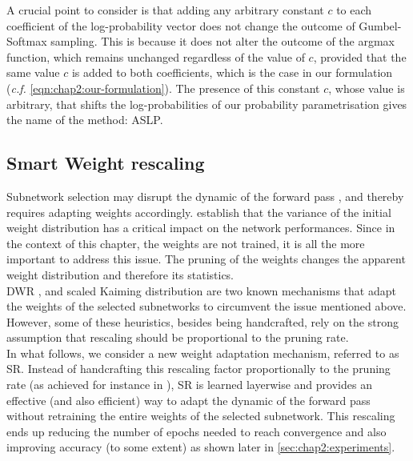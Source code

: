 A crucial point to consider is that adding any arbitrary constant $c$ to each
coefficient of the log-probability vector does not change the outcome of
Gumbel-Softmax sampling. This is because it does not alter the outcome of the
argmax function, which remains unchanged regardless of the value of $c$,
provided that the same value $c$ is added to both coefficients, which is the case
in our formulation (\emph{c.f.} \cref{eqn:chap2:our-formulation}). The
presence of this constant $c$, whose value is arbitrary, that shifts the
log-probabilities of our probability parametrisation gives the name of the
method: \acl{ASLP}.\\ 



\subsection{Smart Weight rescaling}
\label{sec:smart-rescale}
Subnetwork selection may disrupt the dynamic of the forward pass
\cite{DBLP:conf/iccv/HeZRS15,DBLP:conf/cvpr/RamanujanWKFR20}, and thereby
requires adapting weights accordingly. \cite{DBLP:conf/iccv/HeZRS15} establish
that the variance of the initial weight distribution has a critical impact on
the network performances. Since in the context of this chapter, the weights are
not trained, it is all the more important to address this issue. The pruning of
the weights changes the apparent weight distribution and therefore its
statistics.\\

\ac{DWR} \cite{DBLP:conf/nips/ZhouLLY19}, and scaled Kaiming distribution
\cite{DBLP:conf/cvpr/RamanujanWKFR20} are two known mechanisms that adapt the
weights of the selected subnetworks to circumvent the issue mentioned above.
However, some of these heuristics, besides being handcrafted, rely on the
strong assumption that rescaling should be proportional to the pruning rate.\\

In what follows, we consider a new weight adaptation mechanism, referred to as
\ac{SR}. Instead of handcrafting this rescaling factor proportionally
to the pruning rate (as achieved for instance in
\cite{DBLP:conf/nips/ZhouLLY19}), \ac{SR} is learned layerwise and provides an
effective (and also efficient) way to adapt the dynamic of the forward pass
without retraining the entire weights of the selected subnetwork. This
rescaling ends up reducing the number of epochs needed to reach convergence and
also improving accuracy (to some extent) as shown later in \cref{sec:chap2:experiments}. \\

